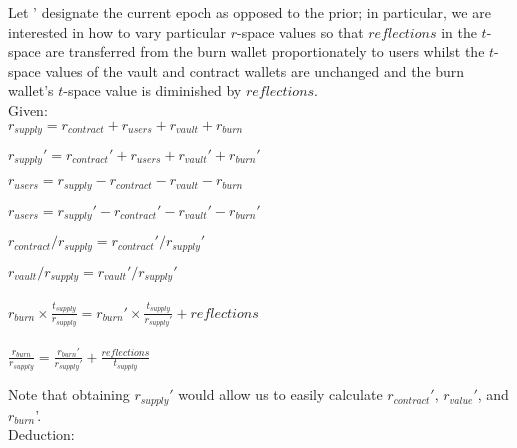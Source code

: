 \documentclass[letterpaper,11pt]{article}
\begin{document}
Let ' designate the current epoch as opposed to the prior; in particular, we are interested in how to vary particular $r$-space values so that $reflections$ in the $t$-space are transferred from the burn wallet proportionately to users whilst the $t$-space values of the vault and contract wallets are unchanged and the burn wallet's $t$-space value is diminished by $reflections$.\\

\noindent Given:\\

$r_{supply}  = r_{contract}  + r_{users} + r_{vault}  + r_{burn}$

$r_{supply}' = r_{contract}' + r_{users} + r_{vault}' + r_{burn}'$   

$r_{users}   = r_{supply}  - r_{contract} - r_{vault}  - r_{burn}$

$r_{users}   = r_{supply}' - r_{contract}' - r_{vault}' - r_{burn}'$

$r_{contract}/r_{supply} = r_{contract}'/r_{supply}'$          	

${r_{vault}}/{r_{supply}}	= {r_{vault}'}/{r_{supply}'}$\\

\vspace{0.15cm}
 \\

$r_{burn} \times \frac{t_{supply}}{r_{supply}}	= r_{burn}' \times \frac{t_{supply}}{r_{supply}'}  + reflections $  \\

\vspace{0.15cm}
\\

$\frac{r_{burn}}{r_{supply}} = \frac{r_{burn}'}{r_{supply}'} + \frac{reflections}{t_{supply}}$ \\



\vspace{0.5cm}
Note that obtaining $r_{supply}'$ would allow us to easily calculate $r_{contract}'$, $r_{value}'$, and $r_{burn}$'.\\

\vspace{0.25cm}
\noindent Deduction:\\
\end{document}
